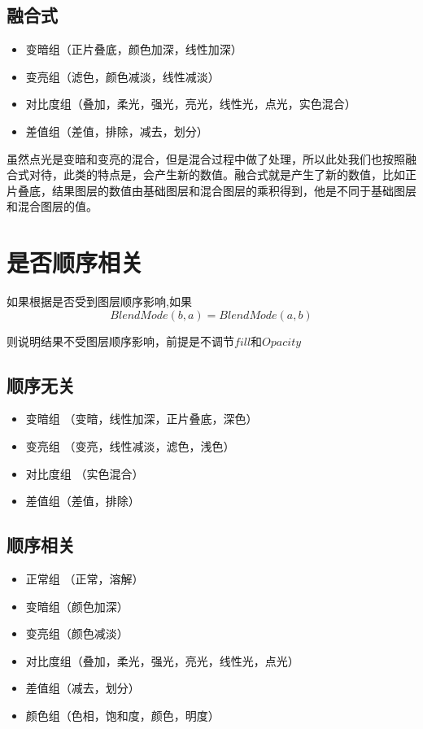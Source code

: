 \subsection{ 融合式}
\begin{itemize}
	\item 变暗组（正片叠底，颜色加深，线性加深）
	\item 变亮组（滤色，颜色减淡，线性减淡）
	\item 对比度组（叠加，柔光，强光，亮光，线性光，点光，实色混合）
	\item 差值组（差值，排除，减去，划分）
\end{itemize}
\begin{notice}
	\item 
 虽然点光是变暗和变亮的混合，但是混合过程中做了处理，所以此处我们也按照融合式对待，此类的特点是，会产生新的数值。融合式就是产生了新的数值，比如正片叠底，结果图层的数值由基础图层和混合图层的乘积得到，他是不同于基础图层和混合图层的值。
 \end{notice}
\section{ 是否顺序相关}
\indent 如果根据是否受到图层顺序影响,如果
\begin{equation}
BlendMode(b,a)=BlendMode(a,b)
\end{equation}

则说明结果不受图层顺序影响，前提是不调节$fill$和$Opacity$
\subsection{ 顺序无关}
\begin{itemize}
	\item 变暗组 （变暗，线性加深，正片叠底，深色）
	\item 变亮组 （变亮，线性减淡，滤色，浅色）
	\item 对比度组 （实色混合）
	\item 差值组（差值，排除）
\end{itemize}

\subsection{ 顺序相关}
\begin{itemize}
	\item 正常组 （正常，溶解）
	\item 变暗组（颜色加深）
	\item 变亮组（颜色减淡）
	\item 对比度组（叠加，柔光，强光，亮光，线性光，点光）
	\item 差值组（减去，划分）
	\item 颜色组（色相，饱和度，颜色，明度）
\end{itemize}
